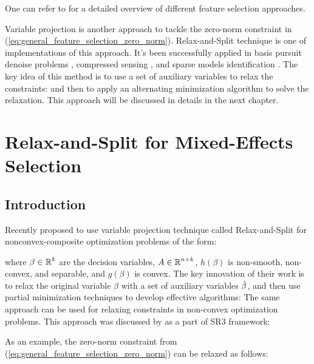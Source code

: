 \documentclass[11pt,letterpaper]{article}
\numberwithin{equation}{section} %
\numberwithin{figure}{section} %
\numberwithin{table}{section} %
\begin{document}
  One can refer to \cite{Muller2013} for a detailed overview of different feature selection approaches.
  
  Variable projection is another approach to tackle the zero-norm constraint in (\ref{eq:general_feature_selection_zero_norm}). Relax-and-Split \cite{Zheng2018RelaxAndSplit} technique is one of implementations of this approach. It's been successfully applied in basis pursuit denoise problems \cite{Baraldi2019}, compressed sensing \cite{Zheng2019}, and sparse models identification \cite{Champion2020}. The key idea of this method is to use a set of auxiliary variables to relax the constraints:
and then to apply an alternating minimization algorithm to solve the relaxation. This approach will be discussed in details in the next chapter.
  

\newpage
\section{Relax-and-Split for Mixed-Effects Selection}
\label{ch:relax_and_split_thesis_work}
\subsection{Introduction}
Recently \cite{Zheng2018RelaxAndSplit} proposed to use variable projection technique called Relax-and-Split for nonconvex-composite optimization problems of the form:

where $\beta \in \operatorname{\mathbb{R}}^k$ are the decision variables, $A\in \operatorname{\mathbb{R}}^{n \times k}$, $h(\beta)$ is non-smooth, non-convex, and separable, and $g(\beta)$ is convex. The key innovation of their work is to relax the original variable $\beta$ with a set of auxiliary variables $\hat\beta$, and then use partial minimization techniques to develop effective algorithms:
The same approach can be used for relaxing constraints in non-convex optimization problems. This approach was discussed by \cite{Zheng2019} as a part of SR3 framework: 

As an example, the zero-norm constraint from (\ref{eq:general_feature_selection_zero_norm}) can be relaxed as follows:
\end{document}
